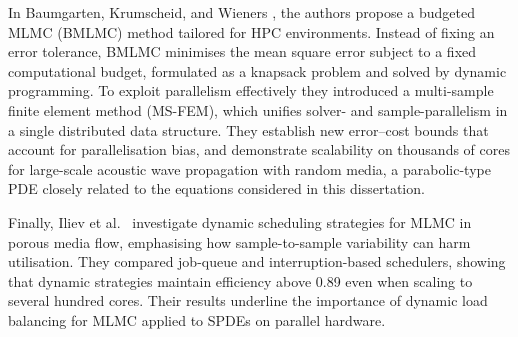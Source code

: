 In Baumgarten, Krumscheid, and Wieners \cite{baumgarten2024fully}, the 
authors propose a budgeted MLMC (BMLMC) method tailored for HPC environments. 
Instead of fixing an error tolerance, BMLMC minimises the mean square error 
subject to a fixed computational budget, formulated as a knapsack problem 
and solved by dynamic programming. To exploit parallelism effectively they 
introduced a multi-sample finite element method (MS-FEM), which unifies 
solver- and sample-parallelism in a single distributed data structure. 
They establish new error--cost bounds that account for parallelisation bias, 
and demonstrate scalability on thousands of cores for large-scale acoustic 
wave propagation with random media, a parabolic-type PDE closely related 
to the equations considered in this dissertation.

Finally, Iliev et al.\ \cite{iliev2021parallel} 
investigate dynamic scheduling strategies for MLMC in porous media flow, 
emphasising how sample-to-sample variability can harm utilisation. They 
compared job-queue and interruption-based schedulers, showing that dynamic 
strategies maintain efficiency above 0.89 even when scaling to several 
hundred cores. Their results underline the importance of dynamic load 
balancing for MLMC applied to SPDEs on parallel hardware.


